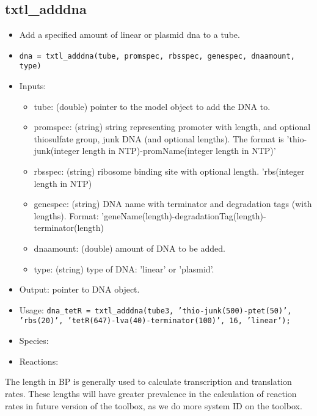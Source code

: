 \documentclass[english]{report}
\begin{document}
		\subsection*{txtl\_adddna}
			\begin{itemize}
			\item Add a specified amount of linear or plasmid dna to a tube.
			\item \texttt{dna = txtl\_adddna(tube, promspec, rbsspec, genespec, dnaamount, type)}
			\item Inputs: 
				\begin{itemize}
				\item tube: (double) pointer to the model object to add the DNA to.
				\item promspec: (string) string representing promoter with length, and optional thiosulfate group, junk DNA (and optional lengths). The format is 'thio-junk(integer length in NTP)-promName(integer length in NTP)'
				\item rbsspec: (string) ribosome binding site with optional length. 'rbs(integer length in NTP)
				\item genespec: (string) DNA name with terminator and degradation tags (with lengths). Format: 'geneName(length)-degradationTag(length)-terminator(length)
				\item dnaamount: (double) amount of DNA to be added.
				\item type: (string) type of DNA: 'linear' or 'plasmid'.
				\end{itemize}
				\item Output: pointer to DNA object.
			\item Usage: \texttt{dna\_tetR = txtl\_adddna(tube3, 'thio-junk(500)-ptet(50)', 'rbs(20)', 'tetR(647)-lva(40)-terminator(100)', 16, 'linear');}
			\item Species:
			\item Reactions:
			\end{itemize}	
			{\color{red} The length in BP is generally used to calculate transcription and translation rates. These lengths will have greater prevalence in the calculation of reaction rates in future version of the toolbox, as we do more system ID on the toolbox.  }	
\end{document}
